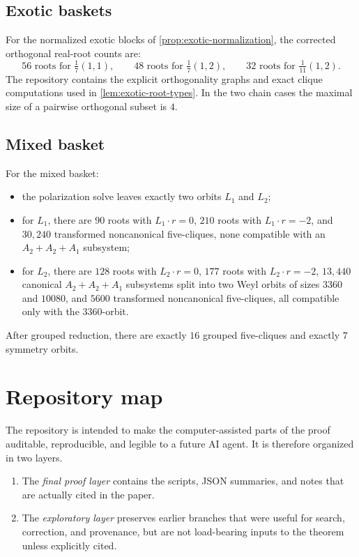 \documentclass[11pt]{article}
\theoremstyle{definition}
\begin{document}
\subsection*{Exotic baskets}
For the normalized exotic blocks of \cref{prop:exotic-normalization}, the corrected orthogonal real-root counts are:
\[
56 \text{ roots for } \tfrac17(1,1),
\qquad
48 \text{ roots for } \tfrac17(1,2),
\qquad
32 \text{ roots for } \tfrac1{11}(1,2).
\]
The repository contains the explicit orthogonality graphs and exact clique computations used in \cref{lem:exotic-root-types}. In the two chain cases the maximal size of a pairwise orthogonal subset is $4$.

\subsection*{Mixed basket}
For the mixed basket:
\begin{itemize}
\item the polarization solve leaves exactly two orbits $L_1$ and $L_2$;
\item for $L_1$, there are $90$ roots with $L_1\cdot r=0$, $210$ roots with $L_1\cdot r=-2$, and $30{,}240$ transformed noncanonical five-cliques, none compatible with an $A_2+A_2+A_1$ subsystem;
\item for $L_2$, there are $128$ roots with $L_2\cdot r=0$, $177$ roots with $L_2\cdot r=-2$, $13{,}440$ canonical $A_2+A_2+A_1$ subsystems split into two Weyl orbits of sizes $3360$ and $10080$, and $5600$ transformed noncanonical five-cliques, all compatible only with the $3360$-orbit.
\end{itemize}
After grouped reduction, there are exactly $16$ grouped five-cliques and exactly $7$ symmetry orbits.

\section{Repository map}\label{app:repo}
The repository is intended to make the computer-assisted parts of the proof auditable, reproducible, and legible to a future AI agent. It is therefore organized in two layers.

\begin{enumerate}[label=\textup{(\roman*)}]
\item The \emph{final proof layer} contains the scripts, JSON summaries, and notes that are actually cited in the paper.
\item The \emph{exploratory layer} preserves earlier branches that were useful for search, correction, and provenance, but are not load-bearing inputs to the theorem unless explicitly cited.
\end{enumerate}
\end{document}

